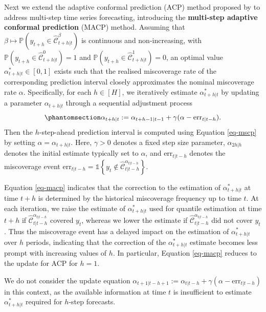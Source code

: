\documentclass[
  11pt,
  12pt]{article}
\theoremstyle{plain}
\theoremstyle{remark}
\begin{document}
Next we extend the adaptive conformal prediction (ACP) method proposed
by \citet{gibbs2021} to address multi-step time series forecasting,
introducing the \textbf{multi-step adaptive conformal prediction} (MACP)
method. Assuming that
\(\beta \mapsto \mathbb{P}(y_{t+h} \in \hat{\mathcal{C}}_{t+h|t}^{\beta})\)
is continuous and non-increasing, with
\(\mathbb{P}(y_{t+h} \in \hat{\mathcal{C}}_{t+h|t}^{0}) = 1\) and
\(\mathbb{P}(y_{t+h} \in \hat{\mathcal{C}}_{t+h|t}^{1}) = 0\), an
optimal value \(\alpha_{t+h|t}^{*} \in [0,1]\) exists such that the
realised miscoverage rate of the corresponding prediction interval
closely approximates the nominal miscoverage rate \(\alpha\).
Specifically, for each \(h \in [H]\), we iteratively estimate
\(\alpha_{t+h|t}^{*}\) by updating a parameter \(\alpha_{t+h|t}\)
through a sequential adjustment process
\begin{equation}\phantomsection\label{eq-macp}{
\alpha_{t+h|t} := \alpha_{t+h-1|t-1} + \gamma(\alpha - \mathrm{err}_{t|t-h}).
}\end{equation} Then the \(h\)-step-ahead prediction interval is
computed using Equation \eqref{eq-mscp} by setting
\(\alpha = \alpha_{t+h|t}\). Here, \(\gamma > 0\) denotes a fixed step
size parameter, \(\alpha_{2h|h}\) denotes the initial estimate typically
set to \(\alpha\), and \(\mathrm{err}_{t|t-h}\) denotes the miscoverage
event
\(\mathrm{err}_{t|t-h} = \mathbb{1}\left\{y_t \notin \hat{\mathcal{C}}_{t|t-h}^{\alpha_{t|t-h}}\right\}\).

Equation \eqref{eq-macp} indicates that the correction to the estimation
of \(\alpha_{t+h|t}^{*}\) at time \(t+h\) is determined by the
historical miscoverage frequency up to time \(t\). At each iteration, we
raise the estimate of \(\alpha_{t+h|t}^{*}\) used for quantile
estimation at time \(t+h\) if
\(\hat{\mathcal{C}}_{t|t-h}^{\alpha_{t|t-h}}\) covered \(y_t\), whereas
we lower the estimate if \(\hat{\mathcal{C}}_{t|t-h}^{\alpha_{t|t-h}}\)
did not cover \(y_t\). Thus the miscoverage event has a delayed impact
on the estimation of \(\alpha_{t+h|t}^{*}\) over \(h\) periods,
indicating that the correction of the \(\alpha_{t+h|t}^{*}\) estimate
becomes less prompt with increasing values of \(h\). In particular,
Equation \eqref{eq-macp} reduces to the update for ACP for \(h=1\).

We do not consider the update equation
\(\alpha_{t+1|t-h+1} := \alpha_{t|t-h} + \gamma(\alpha - \mathrm{err}_{t|t-h})\)
in this context, as the available information at time \(t\) is
insufficient to estimate \(\alpha_{t+h|t}^{*}\) required for \(h\)-step
forecasts.
\end{document}
